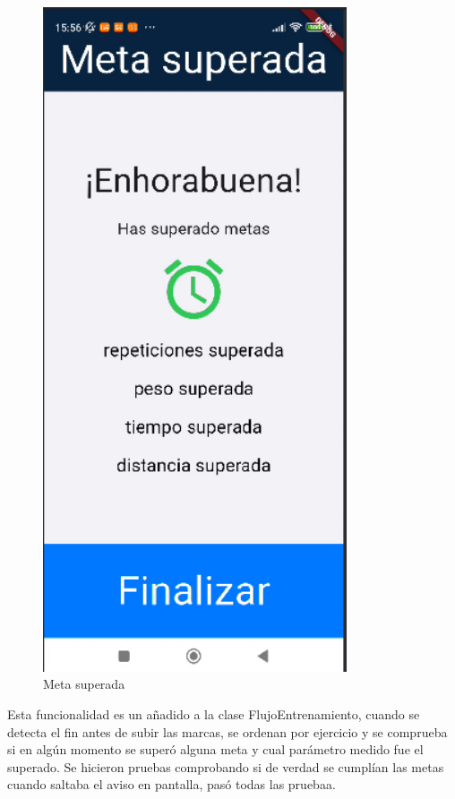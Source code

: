 \begin{figure}[H]
   \centering
    \includegraphics[width=0.8\textwidth]{pantallas/metaSup.png}
    \caption{Meta superada}
    \label{fig:metaSup}
\end{figure}

Esta funcionalidad es un añadido a la clase FlujoEntrenamiento, cuando se detecta el fin antes de subir las marcas, se ordenan por ejercicio y se comprueba si en algún momento se superó alguna meta y cual parámetro medido fue el superado. Se hicieron pruebas comprobando si de verdad se cumplían las metas cuando saltaba el aviso en pantalla, pasó todas las pruebaa.

